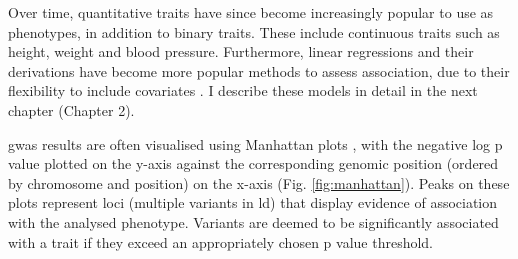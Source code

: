Over time, quantitative traits have since become increasingly popular to use as phenotypes, in addition to binary traits.
These include continuous traits such as height, weight and blood pressure.
Furthermore, linear regressions and their derivations have become more popular methods to assess association, due to their flexibility to include covariates \cite{mccarthy2008genome}.
I describe these models in detail in the next chapter (Chapter 2). 

\newpage

\gls{gwas} results are often visualised using Manhattan plots \cite{mccarthy2008genome}, with the negative log p value plotted on the y-axis against the corresponding genomic position (ordered by chromosome and position) on the x-axis (Fig. \ref{fig:manhattan}). 
Peaks on these plots represent loci (multiple variants in \gls{ld}) that display evidence of association with the analysed phenotype. 
Variants are deemed to be significantly associated with a trait if they exceed an appropriately chosen p value threshold. 

